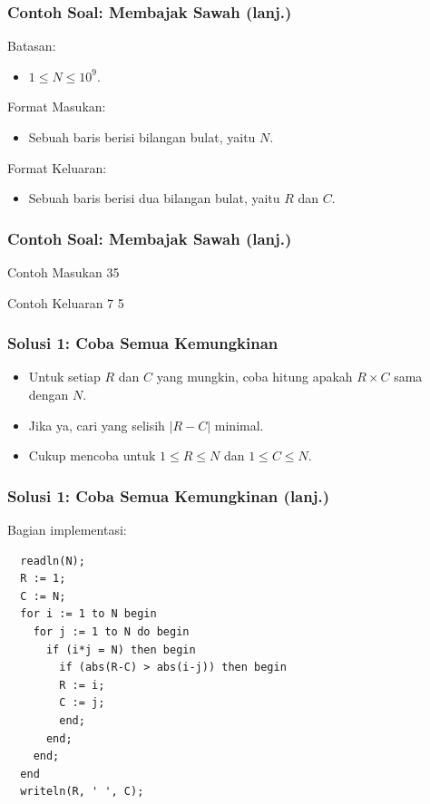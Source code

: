 \begin{frame}
\frametitle{Contoh Soal: Membajak Sawah (lanj.)}
Batasan:
\begin{itemize}
  \item $1 \le N \le 10^9$.
\end{itemize}

\hfill

Format Masukan:
\begin{itemize}
  \item Sebuah baris berisi bilangan bulat, yaitu $N$.
\end{itemize}

\hfill

Format Keluaran:
\begin{itemize}
  \item Sebuah baris berisi dua bilangan bulat, yaitu $R$ dan $C$.
\end{itemize}

\end{frame}

\begin{frame}
\frametitle{Contoh Soal: Membajak Sawah (lanj.)}

\begin{block}{Contoh Masukan}
35
\end{block}

\hfill

\begin{block}{Contoh Keluaran}
7 5
\end{block}

\end{frame}

\begin{frame}
\frametitle{Solusi 1: Coba Semua Kemungkinan}
\begin{itemize}
  \item Untuk setiap $R$ dan $C$ yang mungkin, coba hitung apakah $R \times C$ sama dengan $N$.
  \item Jika ya, cari yang selisih $|R-C|$ minimal.
  \item Cukup mencoba untuk $1 \le R \le N$ dan $1 \le C \le N$.
\end{itemize}
\end{frame}

\begin{frame}[fragile]
\frametitle{Solusi 1: Coba Semua Kemungkinan (lanj.)}
Bagian implementasi:
\begin{lstlisting}
  readln(N);
  R := 1;
  C := N;
  for i := 1 to N begin
    for j := 1 to N do begin
      if (i*j = N) then begin
        if (abs(R-C) > abs(i-j)) then begin
        R := i;
        C := j;
        end;
      end;
    end;
  end
  writeln(R, ' ', C);
\end{lstlisting}
\end{frame}

